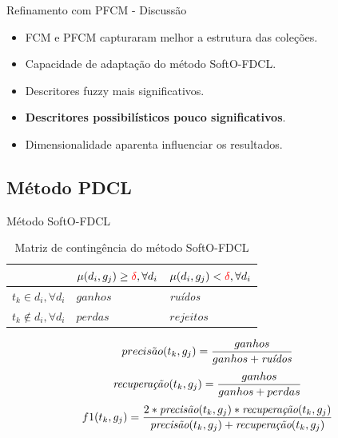 \documentclass[brazil]{beamer}
\begin{document}
\begin{frame}{Refinamento com PFCM - Discussão}
  \begin{itemize}
    \item FCM e PFCM capturaram melhor a estrutura das coleções.
    \item Capacidade de adaptação do método SoftO-FDCL.
    \item Descritores fuzzy mais significativos.
    \item \textbf{Descritores possibilísticos pouco significativos}.
    \item Dimensionalidade aparenta influenciar os resultados.
  \end{itemize}
\end{frame}

\subsection{Método PDCL}

\begin{frame}{Método SoftO-FDCL \cite{Nogueira2013}}
  \begin{table}[!htp]
    \centering
    \begin{tabular}{ |p{2cm}|p{3cm}|p{3cm}|}
      \cline{2-3}
      \multicolumn{1}{p{2cm}|}{} & $\mu(d_i,g_j) \geq {\color{red}\delta}, \forall d_i$ &
      $\mu(d_i,g_j) < {\color{red}\delta}, \forall d_i$ \\
      \hline
      $t_k \in d_i, \forall d_i$ & \parbox[c]{2cm}{\centering $ganhos$} &
      \parbox[c]{2cm}{\centering \it ruídos\/} \\
      \hline
      $t_k \not\in d_i, \forall d_i$ & \parbox[c]{2cm}{\centering $perdas$} &
      \parbox[c]{2cm}{\centering $rejeitos$} \\
      \hline
    \end{tabular}
    \caption{Matriz de contingência do método SoftO-FDCL}
    \label{table:softmatrix}
  \end{table}

  \begin{equation}
    precis\tilde{a}o(t_k,g_j) = \frac{ganhos}{ganhos + \text{\it ruídos}}
    \label{eq:precision}
  \end{equation}
  \begin{equation}
    \text{\it recuperação\/}(t_k,g_j) = \frac{ganhos}{ganhos + perdas}
    \label{eq:recall}
  \end{equation}
  \begin{equation}
    f1(t_k,g_j) = \frac{2 * \text{\it precisão}(t_k,g_j) * \text{\it recuperação}(t_k,g_j)}
    {\text{\it precisão}(t_k,g_j) + \text{\it recuperação}(t_k,g_j)}
    \label{eq:fmeasure}
  \end{equation}

\end{frame}
\end{document}
